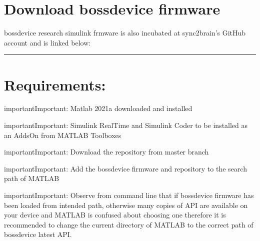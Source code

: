 \documentclass[letterpaper,10pt,english]{sphinxmanual}
\begin{document}
\section{Download bossdevice firmware}
\label{\detokenize{6_downloads_n_dependencies:download-bossdevice-firmware}}
bossdevice research simulink frmware is also incubated at sync2brain’s GitHub account and is linked below:

\begin{sphinxVerbatim}[commandchars=\\\{\}]
\end{sphinxVerbatim}


\bigskip\hrule\bigskip



\section{Requirements:}
\label{\detokenize{6_downloads_n_dependencies:requirements}}
\begin{sphinxadmonition}{important}{Important:}
Matlab 2021a downloaded and installed
\end{sphinxadmonition}

\begin{sphinxadmonition}{important}{Important:}
Simulink Real\sphinxhyphen{}Time and Simulink Coder to be installed as an Adds\sphinxhyphen{}On from MATLAB Toolboxes
\end{sphinxadmonition}

\begin{sphinxadmonition}{important}{Important:}
Download the repository from master branch
\end{sphinxadmonition}

\begin{sphinxadmonition}{important}{Important:}
Add the bossdevice firmware and repository to the search path of MATLAB
\end{sphinxadmonition}

\begin{sphinxadmonition}{important}{Important:}
Observe from command line that if bossdevice firmware has been loaded from intended path, otherwise many copies of API are available on your device and MATLAB is confused about choosing one therefore it is recommended to change the current directory of MATLAB to the correct path of bossdevice latest API.
\end{sphinxadmonition}
\end{document}
